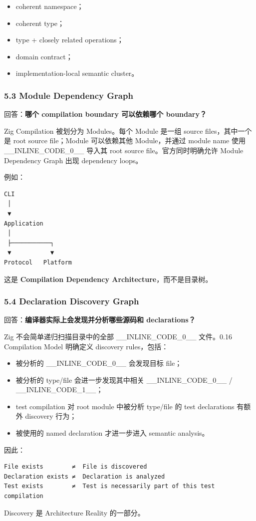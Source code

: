 \documentclass[11pt,a4paper]{article}
\begin{document}
\begin{itemize}
  \item coherent namespace；
  \item coherent type；
  \item type + closely related operations；
  \item domain contract；
  \item implementation-local semantic cluster。
\end{itemize}
\subsubsection{5.3 Module Dependency Graph}
回答：\textbf{哪个 compilation boundary 可以依赖哪个 boundary？}

Zig Compilation 被划分为 Modules。每个 Module 是一组 source files，其中一个是 root source file；Module 可以依赖其他 Module，并通过 module name 使用 \_\_INLINE\_CODE\_0\_\_ 导入其 root source file。官方同时明确允许 Module Dependency Graph 出现 dependency loops。

例如：

\begin{lstlisting}[language=text]
CLI
 │
 ▼
Application
 │
 ├───────────┐
 ▼           ▼
Protocol   Platform
\end{lstlisting}
这是 \textbf{Compilation Dependency Architecture}，而不是目录树。

\subsubsection{5.4 Declaration Discovery Graph}
回答：\textbf{编译器实际上会发现并分析哪些源码和 declarations？}

Zig 不会简单递归扫描目录中的全部 \_\_INLINE\_CODE\_0\_\_ 文件。0.16 Compilation Model 明确定义 discovery rules，包括：

\begin{itemize}
  \item 被分析的 \_\_INLINE\_CODE\_0\_\_ 会发现目标 file；
  \item 被分析的 type/file 会进一步发现其中相关 \_\_INLINE\_CODE\_0\_\_ / \_\_INLINE\_CODE\_1\_\_；
  \item test compilation 对 root module 中被分析 type/file 的 test declarations 有额外 discovery 行为；
  \item 被使用的 named declaration 才进一步进入 semantic analysis。
\end{itemize}
因此：

\begin{lstlisting}[language=text]
File exists        ≠  File is discovered
Declaration exists ≠  Declaration is analyzed
Test exists        ≠  Test is necessarily part of this test compilation
\end{lstlisting}
Discovery 是 Architecture Reality 的一部分。
\end{document}
